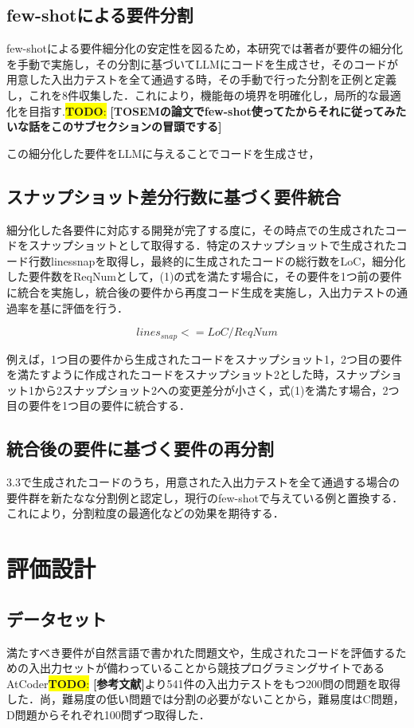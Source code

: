 \documentclass[submit,techrep,noauthor]{ipsj}
\newcommand{\todo}[1]{\colorbox{yellow}{{\bf TODO}:}{\color{red} {\textbf{[#1]}}}}
\begin{document}
\subsection{few-shotによる要件分割}
few-shotによる要件細分化の安定性を図るため，本研究では著者が要件の細分化を手動で実施し，その分割に基づいてLLMにコードを生成させ，そのコードが用意した入出力テストを全て通過する時，その手動で行った分割を正例と定義し，これを8件収集した．これにより，機能毎の境界を明確化し，局所的な最適化を目指す.\todo{TOSEMの論文でfew-shot使ってたからそれに従ってみたいな話をこのサブセクションの冒頭でする}

この細分化した要件をLLMに与えることでコードを生成させ，

\subsection{スナップショット差分行数に基づく要件統合}
細分化した各要件に対応する開発が完了する度に，その時点での生成されたコードをスナップショットとして取得する．特定のスナップショットで生成されたコード行数linessnapを取得し，最終的に生成されたコードの総行数をLoC，細分化した要件数をReqNumとして，(1)の式を満たす場合に，その要件を1つ前の要件に統合を実施し，統合後の要件から再度コード生成を実施し，入出力テストの通過率を基に評価を行う．

\begin{equation}
    lines_{snap} <= LoC / ReqNum
\end{equation}

例えば，1つ目の要件から生成されたコードをスナップショット1，2つ目の要件を満たすように作成されたコードをスナップショット2とした時，スナップショット1から2スナップショット2への変更差分が小さく，式(1)を満たす場合，2つ目の要件を1つ目の要件に統合する．

\subsection{統合後の要件に基づく要件の再分割}
3.3で生成されたコードのうち，用意された入出力テストを全て通過する場合の要件群を新たなな分割例と認定し，現行のfew-shotで与えている例と置換する．これにより，分割粒度の最適化などの効果を期待する．

\section{評価設計}
\subsection{データセット}
満たすべき要件が自然言語で書かれた問題文や，生成されたコードを評価するための入出力セットが備わっていることから競技プログラミングサイトであるAtCoder\todo{参考文献}より541件の入出力テストをもつ200問の問題を取得した．尚，難易度の低い問題では分割の必要がないことから，難易度はC問題，D問題からそれぞれ100問ずつ取得した．
\end{document}
